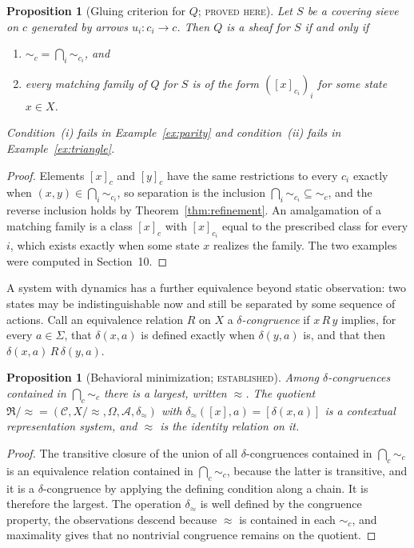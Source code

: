 \documentclass[11pt]{article}
\newtheorem{proposition}[theorem]{Proposition}
\theoremstyle{definition}
\theoremstyle{remark}
\newcommand{\stE}{\textsc{established}}
\newcommand{\stN}{\textsc{proved here}}
\newcommand{\cC}{\mathcal C}
\newcommand{\cA}{\mathcal A}
\newcommand{\fR}{\mathfrak R}
\newcommand{\sk}{\sim}
\begin{document}
\begin{proposition}[Gluing criterion for $Q$; \stN]\label{prop:Qglue}
Let $S$ be a covering sieve on $c$ generated by arrows $u_i:c_i\to c$. Then $Q$ is a sheaf for $S$ if and only if
\begin{enumerate}[label=(\roman*)]
\item ${\sk_c}=\bigcap_i{\sk_{c_i}}$, and
\item every matching family of $Q$ for $S$ is of the form $([x]_{c_i})_i$ for some state $x\in X$.
\end{enumerate}
Condition~(i) fails in Example~\ref{ex:parity} and condition~(ii) fails in Example~\ref{ex:triangle}.
\end{proposition}
\begin{proof}
Elements $[x]_c$ and $[y]_c$ have the same restrictions to every $c_i$ exactly when $(x,y)\in\bigcap_i{\sk_{c_i}}$, so separation is the inclusion $\bigcap_i{\sk_{c_i}}\subseteq{\sk_c}$, and the reverse inclusion holds by Theorem~\ref{thm:refinement}. An amalgamation of a matching family is a class $[x]_c$ with $[x]_{c_i}$ equal to the prescribed class for every $i$, which exists exactly when some state $x$ realizes the family. The two examples were computed in Section~10.
\end{proof}

A system with dynamics has a further equivalence beyond static observation: two states may be indistinguishable now and still be separated by some sequence of actions. Call an equivalence relation $R$ on $X$ a \emph{$\delta$-congruence} if $x\,R\,y$ implies, for every $a\in\Sigma$, that $\delta(x,a)$ is defined exactly when $\delta(y,a)$ is, and that then $\delta(x,a)\,R\,\delta(y,a)$.

\begin{proposition}[Behavioral minimization; \stE]\label{prop:minimization}
Among $\delta$-congruences contained in $\bigcap_c{\sk_c}$ there is a largest, written $\approx$. The quotient $\fR/{\approx}=(\cC,X/{\approx},\Omega,\cA,\delta_{\approx})$ with $\delta_{\approx}([x],a)=[\delta(x,a)]$ is a contextual representation system, and $\approx$ is the identity relation on it.
\end{proposition}
\begin{proof}
The transitive closure of the union of all $\delta$-congruences contained in $\bigcap_c{\sk_c}$ is an equivalence relation contained in $\bigcap_c{\sk_c}$, because the latter is transitive, and it is a $\delta$-congruence by applying the defining condition along a chain. It is therefore the largest. The operation $\delta_\approx$ is well defined by the congruence property, the observations descend because $\approx$ is contained in each $\sk_c$, and maximality gives that no nontrivial congruence remains on the quotient.
\end{proof}
\end{document}
